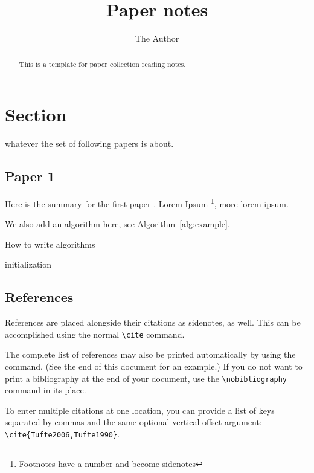 \documentclass{tufte-handout}
\title{Paper notes}
\author{The Author}
\date{}
\begin{document}
\maketitle

\begin{abstract}
\noindent
This is a template for paper collection reading notes.
\end{abstract}


\section{Section}\label{sec:example}
 whatever the set of following papers is about.
\subsection{Paper 1}\label{sec:paper-1}
Here is the summary for the first paper \cite{Tufte2006}. Lorem Ipsum
\footnote{Footnotes have a number and become sidenotes}, more lorem ipsum.

We also add an algorithm here, see Algorithm~\ref{alg:example}.

\begin{algorithm}[tbp]
	\label{alg:example} 
\caption{How to write algorithms}
{}
 initialization\;
\end{algorithm}

\subsection{References}
References are placed alongside their citations as sidenotes,
as well.  This can be accomplished using the normal \Verb|\cite|
command.

The complete list of references may also be printed automatically by using
the \Verb|| command.  (See the end of this document for an
example.)  If you do not want to print a bibliography at the end of your
document, use the \Verb|\nobibliography| command in its place.  

To enter multiple citations at one location,\cite{Tufte2006,Tufte1990} you can
provide a list of keys separated by commas and the same optional vertical
offset argument: \Verb|\cite{Tufte2006,Tufte1990}|.  



\end{document}
